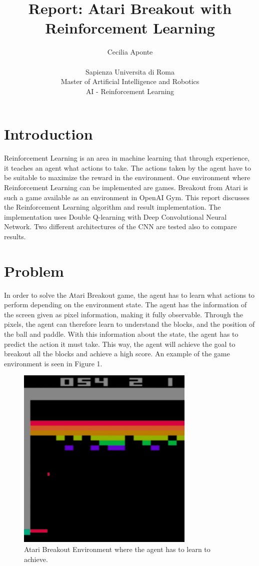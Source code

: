 \documentclass{article}
\title{Report: Atari Breakout with Reinforcement Learning}
\author{ Cecilia Aponte \\ \\
  Sapienza Universita di Roma\\
  Master of Artificial Intelligence and Robotics \\
  AI - Reinforcement Learning\\
}
\begin{document}
\maketitle

\section{Introduction}

Reinforcement Learning is an area in machine learning that through experience, it teaches an agent what actions to take. The actions taken by the agent have to be suitable to maximize the reward in the environment. One environment where Reinforcement Learning can be implemented are games. Breakout from Atari is such a game available as an environment in OpenAI Gym. This report discusses the Reinforcement Learning algorithm and result implementation. The implementation uses Double Q-learning with Deep Convolutional Neural Network. Two different architectures of the CNN are tested also to compare results.

\section{Problem}
In order to solve the Atari Breakout game, the agent has to learn what actions to perform depending on the environment state. The agent has the information of the screen given as pixel information, making it fully observable. Through the pixels, the agent can therefore learn to understand the blocks, and the position of the ball and paddle. With this information about the state, the agent has to predict the action it must take. This way, the agent will achieve the goal to breakout all the blocks and achieve a high score. An example of the game environment is seen in Figure 1. 

\begin{figure}
    \centering
    \includegraphics[width=.6\textwidth]{Breakout_Playing.png}\hfill
    \caption{Atari Breakout Environment where the agent has to learn to achieve.} 
\end{figure}
\end{document}
